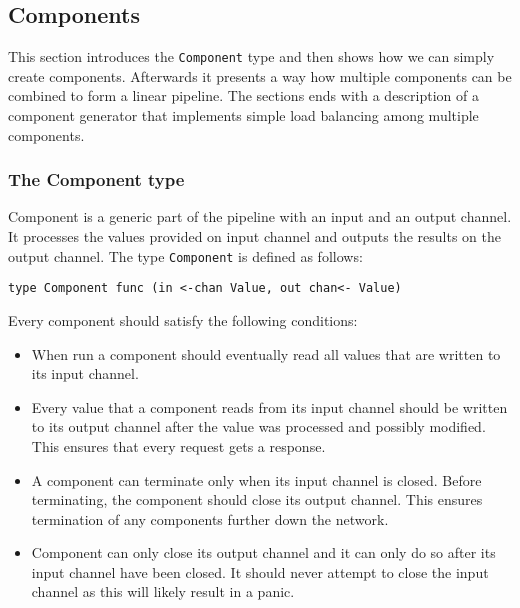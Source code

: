 \subsection{Components}
This section introduces the \texttt{Component} type and then shows how we can simply
create components. Afterwards it presents a way how multiple components can
be combined to form a linear pipeline. The sections ends with a description
of a component generator that implements simple load balancing among
multiple components.

\subsubsection{The Component type}
Component is a generic part of the pipeline with an input and an output channel.
It processes the values provided on input channel and outputs the results
on the output channel. The type \texttt{Component} is defined as follows:
\begin{lstlisting}
type Component func (in <-chan Value, out chan<- Value)
\end{lstlisting}
Every component should satisfy the following conditions:
\begin{itemize}
    \item When run a component should eventually read all values that are
          written to its input channel.

    \item Every value that a component reads from its input channel
          should be written to its output channel after the value was processed
          and possibly modified. This ensures that every request gets a response.

    \item A component can terminate only when its input channel is closed. 
          Before terminating, the component should close its output channel.
          This ensures termination of any components further down the network.

    \item Component can only close its output channel and it can only do so
    	    after its input channel have been closed. It should never attempt
          to close the input channel as this will likely result in a panic.
\end{itemize}

